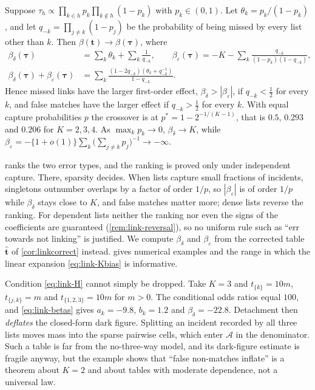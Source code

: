 \begin{corollary}\label{cor:link-indep}
Suppose $\tau_h\propto\prod_{k\in h}p_k\prod_{k\notin h}(1-p_k)$ with $p_k\in(0,1)$. Let $\theta_k=p_k/(1-p_k)$, and let $q_{-k}=\prod_{j\neq k}(1-p_j)$ be the probability of being missed by every list other than $k$. Then $\beta(\bm t)\to\beta(\bm\tau)$, where
\begin{align*}
  \beta_\delta(\bm\tau)&=\sum_{k}\theta_k+\sum_k\frac1{q_{-k}},\qquad
  \beta_\varepsilon(\bm\tau)=-K-\sum_k\frac{q_{-k}}{(1-p_k)(1-q_{-k})},\\
  \beta_\delta(\bm\tau)+\beta_\varepsilon(\bm\tau)&=\sum_k\frac{(1-2q_{-k})(\theta_k+q_{-k}^{-1})}{1-q_{-k}} .
\end{align*}
Hence missed links have the larger first-order effect, $\beta_\delta>|\beta_\varepsilon|$, if $q_{-k}<\frac12$ for every $k$, and false matches have the larger effect if $q_{-k}>\frac12$ for every $k$. With equal capture probabilities $p$ the crossover is at $p^\ast=1-2^{-1/(K-1)}$, that is $0.5$, $0.293$ and $0.206$ for $K=2,3,4$. As $\max_kp_k\to0$, $\beta_\delta\to K$, while $\beta_\varepsilon=-\{1+o(1)\}\sum_k\bigl(\sum_{j\ne k}p_j\bigr)^{-1}\to-\infty$.
\end{corollary}

 ranks the two error types, and the ranking is proved only under independent capture. There, sparsity decides. When lists capture small fractions of incidents, singletons outnumber overlaps by a factor of order $1/p$, so $|\beta_\varepsilon|$ is of order $1/p$ while $\beta_\delta$ stays close to $K$, and false matches matter more; dense lists reverse the ranking. For dependent lists neither the ranking nor even the signs of the coefficients are guaranteed (\cref{rem:link-reversal}), so no uniform rule such as ``err towards not linking'' is justified. We compute $\beta_\delta$ and $\beta_\varepsilon$ from the corrected table $\hat{\bm t}$ of \cref{cor:linkcorrect} instead.  gives numerical examples and the range in which the linear expansion \eqref{eq:link-Kbias} is informative.

\begin{remark}\label{rem:link-reversal}
Condition \eqref{eq:link-H} cannot simply be dropped. Take $K=3$ and $t_{\{k\}}=10m$, $t_{\{j,k\}}=m$ and $t_{\{1,2,3\}}=10m$ for $m>0$. The conditional odds ratios equal $100$, and \eqref{eq:link-betas} gives $a_k=-9.8$, $b_k=1.2$ and $\beta_\delta=-22.8$. Detachment then \emph{deflates} the closed-form dark figure. Splitting an incident recorded by all three lists moves mass into the sparse pairwise cells, which enter $\mathcal A$ in the denominator. Such a table is far from the no-three-way model, and its dark-figure estimate is fragile anyway, but the example shows that ``false non-matches inflate'' is a theorem about $K=2$ and about tables with moderate dependence, not a universal law.
\end{remark}

